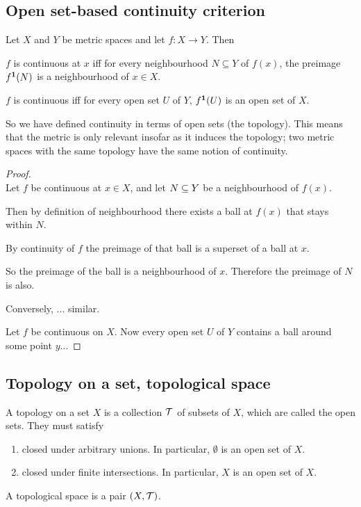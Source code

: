 \subsection{Open set-based continuity criterion}
\begin{theorem}
  Let $X$ and $Y$ be metric spaces and let $f:X \to Y$. Then

  $f$ is continuous at $x$ iff for every neighbourhood $N \subseteq Y$ of $f(x)$, the preimage
  $f^{\mathbf 1}(N)$ is a neighbourhood of $x \in X$.

  $f$ is continuous iff for every open set $U$ of $Y$, $f^{\mathbf 1}(U)$ is an open set of $X$.
\end{theorem}

\begin{remark*}
  So we have defined continuity in terms of open sets (the topology). This means that the metric is
  only relevant insofar as it induces the topology; two metric spaces with the same topology have
  the same notion of continuity.
\end{remark*}

\begin{proof}~\\
  Let $f$ be continuous at $x \in X$, and let $N \subseteq Y$ be a neighbourhood of $f(x)$.

  Then by definition of neighbourhood there exists a ball at $f(x)$ that stays within $N$.

  By continuity of $f$ the preimage of that ball is a superset of a ball at $x$.

  So the preimage of the ball is a neighbourhood of $x$. Therefore the preimage of $N$ is also.

  Conversely, ... similar.

  Let $f$ be continuous on $X$. Now every open set $U$ of $Y$ contains a ball around some point $y$...
\end{proof}

\subsection{Topology on a set, topological space}
\begin{definition}
  A topology on a set $X$ is a collection $\mathcal T$ of subsets of $X$, which are called the open
  sets. They must satisfy
  \begin{enumerate}
  \item closed under arbitrary unions. In particular, $\emptyset$ is an open set of $X$.
  \item closed under finite intersections. In particular, $X$ is an open set of $X$.
  \end{enumerate}
  A topological space is a pair $(X, \mathcal T)$.
\end{definition}

